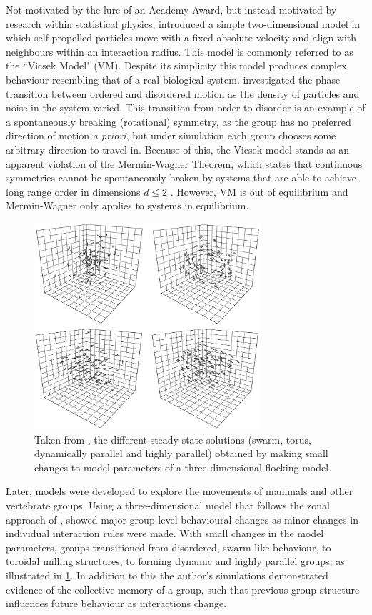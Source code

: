 Not motivated by the lure of an Academy Award, but instead motivated by research within
statistical physics, \textcite{vicsek95} introduced a simple two-dimensional model in
which self-propelled particles move with a fixed absolute velocity and align with
neighbours within an interaction radius. This model is commonly referred to as the ``Vicsek
Model" (VM). Despite its simplicity this model produces complex behaviour resembling that
of a real biological system. \textcite{vicsek95} investigated the phase transition between
ordered and disordered motion as the density of particles and noise in the system varied.
This transition from order to disorder is an example of a spontaneously breaking
(rotational) symmetry, as the group has no preferred direction of motion \emph{a priori},
but under simulation each group chooses some arbitrary direction to travel in. Because of
this, the Vicsek model stands as an apparent violation of the Mermin-Wagner Theorem,
which states that continuous symmetries cannot be spontaneously broken by systems that are
able to achieve long range order in dimensions $d\leq 2$ \parencite{mermin66}. However, VM
is out of equilibrium and Mermin-Wagner only applies to systems in equilibrium.

\begin{figure}[tb]
	\includegraphics[width=0.75\textwidth]{couzin.png}
    \caption{Taken from \textcite{couzin02}, the different steady-state solutions (swarm,
    torus, dynamically parallel and highly parallel) obtained by making small changes to
    model parameters of a three-dimensional flocking model.}
	\label{fig:couzin}
\end{figure}

Later, models were developed to explore the movements of mammals and other vertebrate
groups. Using a three-dimensional model that follows the zonal approach of \textcite{aoki82},
\textcite{couzin02} showed major group-level behavioural changes as minor changes in
individual interaction rules were made.  With small changes in the model parameters,
groups transitioned from disordered, swarm-like behaviour, to toroidal milling structures,
to forming dynamic and highly parallel groups, as illustrated in \cref{fig:couzin}. In
addition to this the author's simulations demonstrated evidence of the collective memory
of a group, such that previous group structure influences future behaviour as interactions
change.

